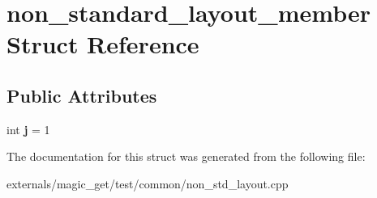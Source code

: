 \hypertarget{structnon__standard__layout__member}{}\section{non\+\_\+standard\+\_\+layout\+\_\+member Struct Reference}
\label{structnon__standard__layout__member}
\subsection*{Public Attributes}
\begin{DoxyCompactItemize}
\item 
\mbox{\label{structnon__standard__layout__member_a35a713b89087bd79863d228c6ba53373}} 
int {\bfseries j} = 1
\end{DoxyCompactItemize}


The documentation for this struct was generated from the following file\+:\begin{DoxyCompactItemize}
\item 
externals/magic\+\_\+get/test/common/non\+\_\+std\+\_\+layout.\+cpp\end{DoxyCompactItemize}
